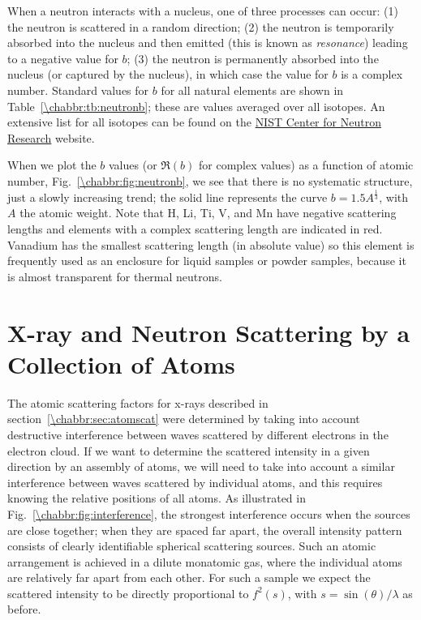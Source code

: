 When a neutron interacts with a nucleus, one of three processes can occur: (1) the neutron is scattered in a random direction; (2) the neutron is temporarily absorbed into the nucleus and then emitted (this is known as \textit{resonance}) leading to a negative value for $b$; (3) the neutron is permanently absorbed into the nucleus (or captured by the nucleus), in which case the value for $b$ is a complex number. Standard values for $b$ for all natural elements are shown in Table~\ref{\chabbr:tb:neutronb}; these are values averaged over all isotopes. An extensive list for all isotopes can be found on the \href{http://www.ncnr.nist.gov/resources/n-lengths/list.html}{NIST Center for Neutron Research} website.

When we plot the $b$ values (or $\Re(b)$ for complex values) as a function of atomic number, Fig.~\ref{\chabbr:fig:neutronb}, we see that there is no systematic structure, just a slowly increasing trend; the solid line represents the curve $b=1.5 A^{\frac{1}{3}}$, with $A$ the atomic weight.  Note that H, Li, Ti, V, and Mn have negative scattering lengths and elements with a complex scattering length are indicated in red. Vanadium has the smallest scattering length (in absolute value) so this element is frequently used as an enclosure for liquid samples or powder samples, because it is almost transparent for thermal neutrons. 


\section{X-ray and Neutron Scattering by a Collection of Atoms}\label{\chabbr:sec:scatatoms}

The atomic scattering factors for x-rays described in section~\ref{\chabbr:sec:atomscat} were determined by taking into account destructive interference between waves scattered by different electrons in the electron cloud. If we want to determine the scattered intensity in a given direction by an assembly of atoms, we will need to take into account a similar interference between waves scattered by individual atoms, and this requires knowing the relative positions of all atoms.  As illustrated in Fig.~\ref{\chabbr:fig:interference}, the strongest interference occurs when the sources are close together; when they are spaced far apart, the overall intensity pattern consists of clearly identifiable spherical scattering sources.  Such an atomic arrangement is achieved in a dilute monatomic gas, where the individual atoms are relatively far apart from each other. For such a sample we expect the scattered intensity to be directly proportional to $f^2(s)$, with $s=\sin(\theta)/\lambda$ as before.  

